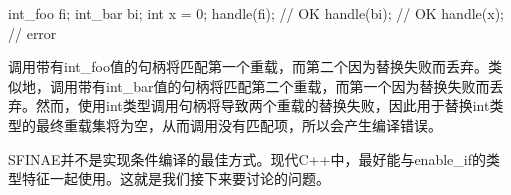 \begin{cpp}
int_foo fi;
int_bar bi;
int x = 0;
handle(fi); // OK
handle(bi); // OK
handle(x); // error
\end{cpp}

调用带有int\_foo值的句柄将匹配第一个重载，而第二个因为替换失败而丢弃。类似地，调用带有int\_bar值的句柄将匹配第二个重载，而第一个因为替换失败而丢弃。然而，使用int类型调用句柄将导致两个重载的替换失败，因此用于替换int类型的最终重载集将为空，从而调用没有匹配项，所以会产生编译错误。

SFINAE并不是实现条件编译的最佳方式。现代C++中，最好能与enable\_if的类型特征一起使用。这就是我们接下来要讨论的问题。























